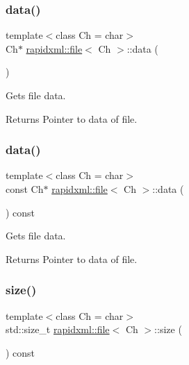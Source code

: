 \subsubsection{\texorpdfstring{data()}{data()}\hspace{0.1cm}{\footnotesize\ttfamily [1/2]}}
{\footnotesize\ttfamily template$<$class Ch  = char$>$ \\
Ch$\ast$ \hyperlink{classrapidxml_1_1file}{rapidxml\+::file}$<$ Ch $>$\+::data (\begin{DoxyParamCaption}{ }\end{DoxyParamCaption})\hspace{0.3cm}{\ttfamily [inline]}}

Gets file data. \begin{DoxyReturn}{Returns}
Pointer to data of file. 
\end{DoxyReturn}
\mbox{\label{classrapidxml_1_1file_a044bdd99e59157b8a5a1b28c2f32da4d}} 
\subsubsection{\texorpdfstring{data()}{data()}\hspace{0.1cm}{\footnotesize\ttfamily [2/2]}}
{\footnotesize\ttfamily template$<$class Ch  = char$>$ \\
const Ch$\ast$ \hyperlink{classrapidxml_1_1file}{rapidxml\+::file}$<$ Ch $>$\+::data (\begin{DoxyParamCaption}{ }\end{DoxyParamCaption}) const\hspace{0.3cm}{\ttfamily [inline]}}

Gets file data. \begin{DoxyReturn}{Returns}
Pointer to data of file. 
\end{DoxyReturn}
\mbox{\label{classrapidxml_1_1file_aacd451b3def3ad056fe8342dccee35cd}} 
\subsubsection{\texorpdfstring{size()}{size()}}
{\footnotesize\ttfamily template$<$class Ch  = char$>$ \\
std\+::size\+\_\+t \hyperlink{classrapidxml_1_1file}{rapidxml\+::file}$<$ Ch $>$\+::size (\begin{DoxyParamCaption}{ }\end{DoxyParamCaption}) const\hspace{0.3cm}{\ttfamily [inline]}}


